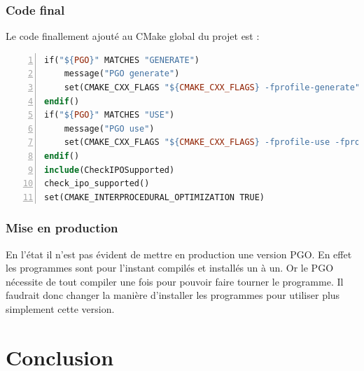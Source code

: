 \documentclass[a4paper]{report}
\begin{document}
        \subsection{Code final}
            Le code finallement ajouté au CMake global du projet est :
            \begin{lstlisting}[language=make,breaklines=true,numbers=left]
if("${PGO}" MATCHES "GENERATE")
    message("PGO generate")
    set(CMAKE_CXX_FLAGS "${CMAKE_CXX_FLAGS} -fprofile-generate")
endif()
if("${PGO}" MATCHES "USE")
    message("PGO use")
    set(CMAKE_CXX_FLAGS "${CMAKE_CXX_FLAGS} -fprofile-use -fprofile-correction")
endif()
include(CheckIPOSupported)
check_ipo_supported()
set(CMAKE_INTERPROCEDURAL_OPTIMIZATION TRUE)
            \end{lstlisting}

        \subsection{Mise en production}
            En l'état il n'est pas évident de mettre en production une version PGO.
            En effet les programmes sont pour l'instant compilés et installés un à un.
            Or le PGO nécessite de tout compiler une fois pour pouvoir faire tourner le programme.
            Il faudrait donc changer la manière d'installer les programmes pour utiliser plus simplement cette version.

\chapter*{Conclusion}


\printbibliography
\end{document}
